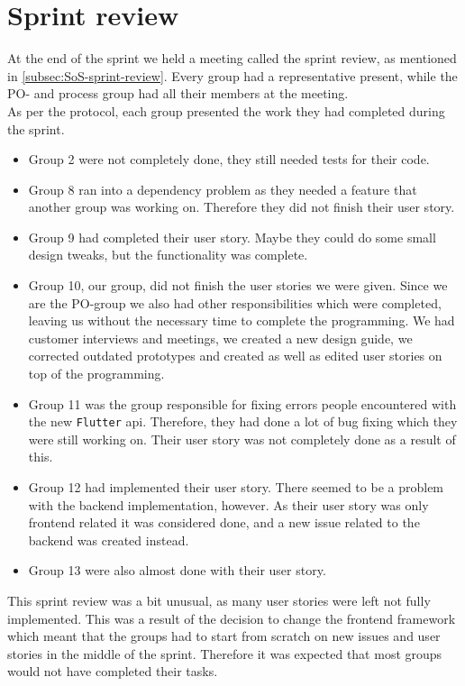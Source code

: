 \section{Sprint review}
At the end of the sprint we held a meeting called the sprint review, as mentioned in \autoref{subsec:SoS-sprint-review}.
Every group had a representative present, while the PO- and process group had all their members at the meeting.
\\
As per the protocol, each group presented the work they had completed during the sprint.
\begin{itemize}
    \item Group 2 were not completely done, they still needed tests for their code.
    \item Group 8 ran into a dependency problem as they needed a feature that another group was working on. Therefore they did not finish their user story.
    \item Group 9 had completed their user story. Maybe they could do some small design tweaks, but the functionality was complete.
    \item Group 10, our group, did not finish the user stories we were given. Since we are the PO-group we also had other responsibilities which were completed, leaving us without the necessary time to complete the programming. We had customer interviews and meetings, we created a new design guide, we corrected outdated prototypes and created as well as edited user stories on top of the programming.
    \item Group 11 was the group responsible for fixing errors people encountered with the new \texttt{Flutter} api. Therefore, they had done a lot of bug fixing which they were still working on. Their user story was not completely done as a result of this.
    \item Group 12 had implemented their user story. There seemed to be a problem with the backend implementation, however. As their user story was only frontend related it was considered done, and a new issue related to the backend was created instead.
    \item Group 13 were also almost done with their user story.
\end{itemize}
\noindent
This sprint review was a bit unusual, as many user stories were left not fully implemented. This was a result of the decision to change the frontend framework which meant that the groups had to start from scratch on new issues and user stories in the middle of the sprint.
Therefore it was expected that most groups would not have completed their tasks.

